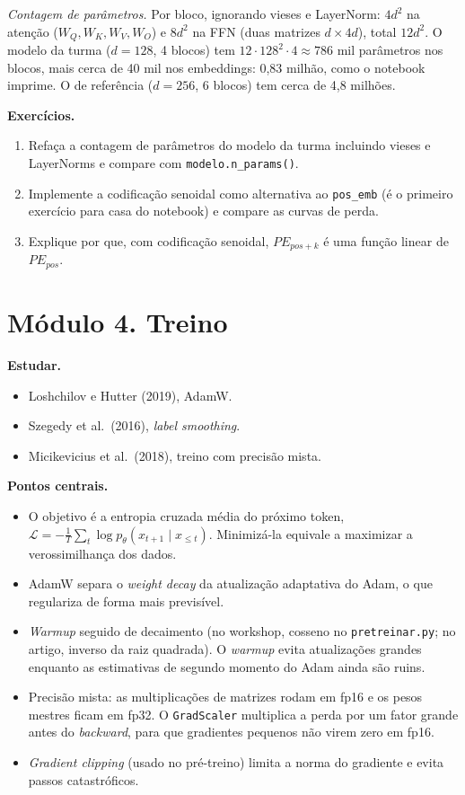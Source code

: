 \documentclass[
  11pt,
]{article}
\providecommand{\tightlist}{%
  \setlength{\itemsep}{0pt}\setlength{\parskip}{0pt}}
\begin{document}
\emph{Contagem de parâmetros.} Por bloco, ignorando vieses e LayerNorm:
\(4d^2\) na atenção (\(W_Q, W_K, W_V, W_O\)) e \(8d^2\) na FFN (duas
matrizes \(d \times 4d\)), total \(12d^2\). O modelo da turma
(\(d = 128\), 4 blocos) tem \(12 \cdot 128^2 \cdot 4 \approx 786\) mil
parâmetros nos blocos, mais cerca de 40 mil nos embeddings: 0,83 milhão,
como o notebook imprime. O de referência (\(d = 256\), 6 blocos) tem
cerca de 4,8 milhões.

\textbf{Exercícios.}

\begin{enumerate}
\def\labelenumi{\arabic{enumi}.}
\tightlist
\item
  Refaça a contagem de parâmetros do modelo da turma incluindo vieses e
  LayerNorms e compare com \texttt{modelo.n\_params()}.
\item
  Implemente a codificação senoidal como alternativa ao
  \texttt{pos\_emb} (é o primeiro exercício para casa do notebook) e
  compare as curvas de perda.
\item
  Explique por que, com codificação senoidal, \(PE_{pos+k}\) é uma
  função linear de \(PE_{pos}\).
\end{enumerate}

\section{Módulo 4. Treino}\label{muxf3dulo-4.-treino}

\textbf{Estudar.}

\begin{itemize}
\tightlist
\item
  Loshchilov e Hutter (2019), AdamW.
\item
  Szegedy et al.~(2016), \emph{label smoothing}.
\item
  Micikevicius et al.~(2018), treino com precisão mista.
\end{itemize}

\textbf{Pontos centrais.}

\begin{itemize}
\tightlist
\item
  O objetivo é a entropia cruzada média do próximo token,
  \(\mathcal{L} = -\frac{1}{T}\sum_t \log p_\theta(x_{t+1} \mid x_{\le t})\).
  Minimizá-la equivale a maximizar a verossimilhança dos dados.
\item
  AdamW separa o \emph{weight decay} da atualização adaptativa do Adam,
  o que regulariza de forma mais previsível.
\item
  \emph{Warmup} seguido de decaimento (no workshop, cosseno no
  \texttt{pretreinar.py}; no artigo, inverso da raiz quadrada). O
  \emph{warmup} evita atualizações grandes enquanto as estimativas de
  segundo momento do Adam ainda são ruins.
\item
  Precisão mista: as multiplicações de matrizes rodam em fp16 e os pesos
  mestres ficam em fp32. O \texttt{GradScaler} multiplica a perda por um
  fator grande antes do \emph{backward}, para que gradientes pequenos
  não virem zero em fp16.
\item
  \emph{Gradient clipping} (usado no pré-treino) limita a norma do
  gradiente e evita passos catastróficos.
\end{itemize}
\end{document}
